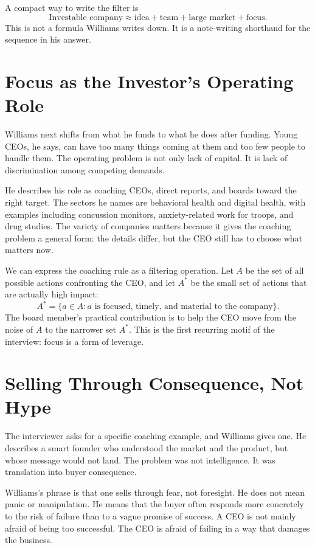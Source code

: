 A compact way to write the filter is
\begin{equation}
\text{Investable company}
\approx
\text{idea}
+
\text{team}
+
\text{large market}
+
\text{focus}.
\end{equation}
This is not a formula Williams writes down. It is a note-writing shorthand for the sequence in his answer.

\section{Focus as the Investor's Operating Role}

Williams next shifts from what he funds to what he does after funding. Young CEOs, he says, can have too many things coming at them and too few people to handle them. The operating problem is not only lack of capital. It is lack of discrimination among competing demands.

He describes his role as coaching CEOs, direct reports, and boards toward the right target. The sectors he names are behavioral health and digital health, with examples including concussion monitors, anxiety-related work for troops, and drug studies. The variety of companies matters because it gives the coaching problem a general form: the details differ, but the CEO still has to choose what matters now.

We can express the coaching rule as a filtering operation. Let \(A\) be the set of all possible actions confronting the CEO, and let \(A^\ast\) be the small set of actions that are actually high impact:
\begin{equation}
A^\ast = \{a \in A : a \text{ is focused, timely, and material to the company}\}.
\end{equation}
The board member's practical contribution is to help the CEO move from the noise of \(A\) to the narrower set \(A^\ast\). This is the first recurring motif of the interview: focus is a form of leverage.

\section{Selling Through Consequence, Not Hype}

The interviewer asks for a specific coaching example, and Williams gives one. He describes a smart founder who understood the market and the product, but whose message would not land. The problem was not intelligence. It was translation into buyer consequence.

Williams's phrase is that one sells through fear, not foresight. He does not mean panic or manipulation. He means that the buyer often responds more concretely to the risk of failure than to a vague promise of success. A CEO is not mainly afraid of being too successful. The CEO is afraid of failing in a way that damages the business.

